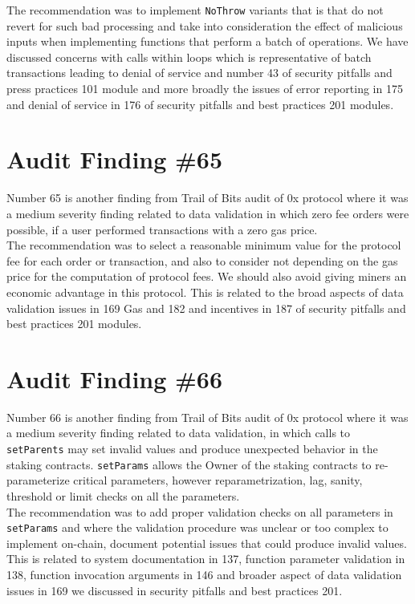 The recommendation was to implement \verb|NoThrow| variants that is that do not revert for such bad processing and take into consideration the effect of malicious inputs when implementing functions that perform a batch of operations. We have discussed concerns with calls within loops which is representative of batch transactions leading to denial of service and number 43 of security pitfalls and press practices 101 module and more broadly the issues of error reporting in 175 and denial of service in 176 of security pitfalls and best practices 201 modules.

\section{Audit Finding \#65}

Number 65 is another finding from Trail of Bits audit of 0x protocol where it was a medium severity finding related to data validation in which zero fee orders were possible, if a user performed transactions with a zero gas price.\\

The recommendation was to select a reasonable minimum value for the protocol fee for each order or transaction, and also to consider not depending on the gas price for the computation of protocol fees. We should also avoid giving miners an economic advantage in this protocol. This is related to the broad aspects of data validation issues in 169 Gas and 182 and incentives in 187 of security pitfalls and best practices 201 modules.

\section{Audit Finding \#66}

Number 66 is another finding from Trail of Bits audit of 0x protocol where it was a medium severity finding related to data validation, in which calls to \verb|setParents| may set invalid values and produce unexpected behavior in the staking contracts. \verb|setParams| allows the Owner of the staking contracts to re-parameterize critical parameters, however reparametrization, lag, sanity, threshold or limit checks on all the parameters.\\

The recommendation was to add proper validation checks on all parameters in \verb|setParams| and where the validation procedure was unclear or too complex to implement on-chain, document potential issues that could produce invalid values. This is related to system documentation in 137, function parameter validation in 138, function invocation arguments in 146 and broader aspect of data validation issues in 169 we discussed in security pitfalls and best practices 201.

